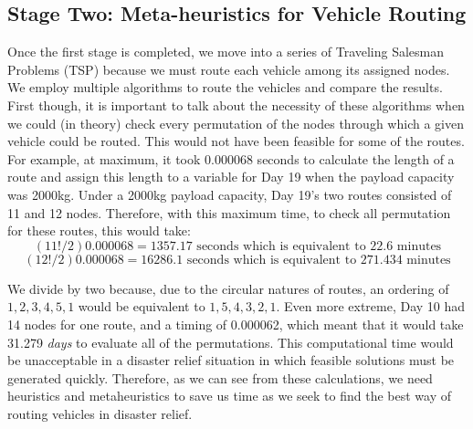 \documentclass[11pt]{article}
\begin{document}




\subsection{Stage Two: Meta-heuristics for Vehicle Routing}
Once the first stage is completed, we move into a series of Traveling Salesman Problems (TSP) because we must route each vehicle among its assigned nodes.  We employ multiple algorithms to route the vehicles and compare the results. 
First though, it is important to talk about the necessity of these algorithms when we could (in theory) check every permutation of the nodes through which a given vehicle could be routed.  This would not have been feasible for some of the routes.  For example, at maximum, it took 0.000068 seconds to calculate the length of a route and assign this length to a variable for Day 19 when the payload capacity was 2000kg.  Under a 2000kg payload capacity, Day 19's two routes consisted of 11 and 12 nodes.  Therefore, with this maximum time, to check all permutation for these routes, this would take:
\[ (11!/2) 0.000068 = 1357.17 \text{ seconds which is equivalent to 22.6 minutes} \]
\[ (12!/2) 0.000068 = 16286.1 \text{ seconds which is equivalent to 271.434 minutes} \]

\noindent We divide by two because, due to the circular natures of routes, an ordering of $1, 2, 3, 4, 5, 1$ would be equivalent to $1, 5, 4, 3, 2, 1$. Even more extreme, Day 10 had 14 nodes for one route, and a timing of 0.000062, which meant that it would take 31.279 \textit{days} to evaluate all of the permutations.  This computational time would be unacceptable in a disaster relief situation in which feasible solutions must be generated quickly. Therefore, as we can see from these calculations, we need heuristics and metaheuristics to save us time as we seek to find the best way of routing vehicles in disaster relief.  
\end{document}
